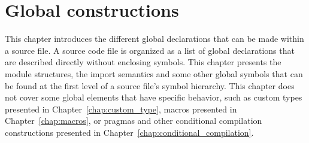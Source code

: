 \pagecolor{gray!10!white}
\chapter{Global constructions}%
\label{chap:global_construction}

This chapter introduces the different global declarations that can be made
within a source file. A source code file is organized as a list of global
declarations that are described directly without enclosing symbols. This chapter
presents the module structures, the import semantics and some other global
symbols that can be found at the first level of a source file's symbol
hierarchy. This chapter does not cover some global elements that have specific
behavior, such as custom types presented in Chapter~\ref{chap:custom_type},
macros presented in Chapter~\ref{chap:macros}, or pragmas and other conditional
compilation constructions presented in
Chapter~\ref{chap:conditional_compilation}.

\minitoc%


